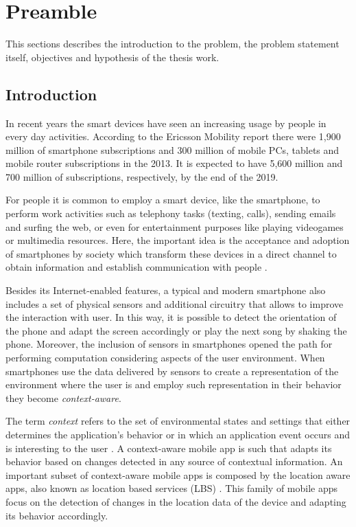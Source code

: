 \section{Preamble}
\label{sec:preamble}
This sections describes the introduction to the problem, the problem statement itself, objectives and hypothesis of the thesis work.

\subsection{Introduction}
\label{sub:introduction}

In recent years the smart devices have seen an increasing usage by people in every day activities.
According to the Ericsson Mobility report \cite{Qureshi2014} there were 1,900 million of smartphone subscriptions and 300 million of mobile PCs, tablets and mobile router subscriptions in the 2013.
It is expected to have 5,600 million and 700 million of subscriptions, respectively, by the end of the 2019.


For people it is common to employ a smart device, like the smartphone, to perform work activities such as telephony tasks (texting, calls), sending emails and surfing the web, or even for entertainment purposes like playing videogames or multimedia resources. 
Here, the important idea is the acceptance and adoption of smartphones by society which transform these devices in a direct channel to obtain information and establish communication with people \cite{Perez-Torres2012a}.


Besides its Internet-enabled features, a typical and modern smartphone also includes a set of physical sensors and additional circuitry that allows to improve the interaction with user. In this way, it is possible to detect the orientation of the phone and adapt the screen accordingly or play the next song by shaking the phone.
Moreover, the inclusion of sensors in smartphones opened the path for performing computation considering aspects of the user environment. When smartphones use the data delivered by sensors to create a representation of the environment where the user is and employ such representation in their behavior they become \emph{context-aware}.


The term \emph{context} refers to the set of environmental states and settings that either determines the application’s behavior or in which an application event occurs and is interesting to the user \cite{Chen2000}.
A context-aware mobile app is such that adapts its behavior based on changes detected in any source of contextual information.
An important subset of context-aware mobile apps is composed by the location aware apps, also known as location based services (LBS) \cite{Zhuang2010,Kjaergaard2012}. 
This family of mobile apps focus on the detection of changes in the location data of the device and adapting its behavior accordingly.


